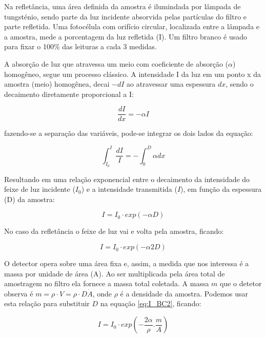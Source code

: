 Na refletância, uma área definida da amostra é ilumindada por lâmpada de 
tungsténio, sendo parte da luz incidente absorvida pelas partículas do 
filtro e parte refletida. Uma fotocélula com orifício circular, localizada
entre a lâmpada e a amostra, mede a porcentagem da luz refletida (I).
Um filtro branco é usado para fixar o 100\% das leituras a cada 3 medidas.

A absorção de luz que atravessa um meio com coeficiente de absorção ($\alpha$) 
homogêneo, segue um processo clássico. A intensidade I da luz em um ponto x da
amostra (meio) homogênea, decai $-dI$ ao atravessar uma espessura $dx$, 
sendo o decaimento diretamente proporcional a I:

\begin{equation}
  \label{eq:dIdx}
   \frac{dI}{dx} = -\alpha I
\end{equation}

fazendo-se a separação das variáveis, pode-se integrar os dois lados da equação:

\begin{equation}
  \int_{I_0}^{I} \frac{dI}{I} = - \int_{0}^{D} \alpha dx
\end{equation}

Resultando em uma relação exponencial entre o decaimento da intensidade do feixe
de luz incidente ($I_0$) e a intensidade transmitida ($I$), 
em função da espessura (D) da amostra:

\begin{equation}
  \label{eq:I_BC}
  I = I_0 \cdot exp(-\alpha D)
\end{equation}

No caso da refletância o feixe de luz vai e volta pela amostra, ficando:

\begin{equation}
  \label{eq:I_BC2}
  I = I_0 \cdot exp(-\alpha 2D)
\end{equation}

O detector opera sobre uma área fixa e, assim, a medida que nos interessa é a 
massa por unidade de área (A). Ao ser multiplicada pela área total de amostragem
no filtro ela fornece a massa total coletada. A massa $m$ que o detetor observa 
é $m = \rho \cdot V = \rho \cdot D \dot A$, onde $\rho$ é a densidade da amostra. 
Podemos usar esta relação para substituir $D$ na equação \ref{eq:I_BC2}, 
ficando:

\begin{equation}
  \label{m/a}
  I = I_0 \cdot exp \left( -\frac{2\alpha}{\rho}.\frac{m}{A} \right)
\end{equation}

